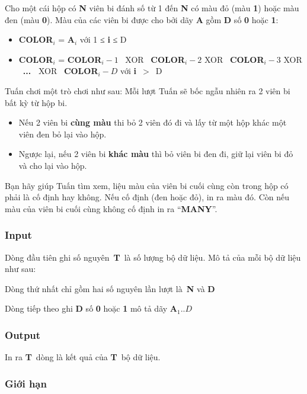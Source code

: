 

Cho một cái hộp có \textbf{N} viên bi đánh số từ 1 đến \textbf{N} có màu đỏ (màu \textbf{1}) hoặc màu đen (màu \textbf{0}). Màu của các viên bi được cho bởi dãy \textbf{A} gồm \textbf{D} số \textbf{0} hoặc \textbf{1}:
\begin{itemize}
	\item \textbf{\textbf{COLOR$_i$}} = \textbf{A$_i$} với 1 ≤ \textbf{i} ≤ D
	\item \textbf{COLOR$_i$} = \textbf{COLOR$_i - 1$}  XOR  \textbf{COLOR$_i - 2 $} XOR  \textbf{COLOR$_i - 3 $} XOR  \textbf{... } XOR  \textbf{COLOR$_i - D$} với \textbf{i} $>$ D
\end{itemize}

Tuấn chơi một trò chơi như sau: Mỗi lượt Tuấn sẽ bốc ngẫu nhiên ra 2 viên bi bất kỳ từ hộp bi.
\begin{itemize}
	\item Nếu 2 viên bi \textbf{cùng màu} thi bỏ 2 viên đó đi và lấy từ một hộp khác một viên đen bỏ lại vào hộp.
	\item Ngược lại, nếu 2 viên bi \textbf{khác màu} thì bỏ viên bi đen đi, giữ lại viên bi đỏ và cho lại vào hộp.
\end{itemize}

Bạn hãy giúp Tuấn tìm xem, liệu màu của viên bi cuối cùng còn trong hộp có phải là cố định hay không. Nếu cố định (đen hoặc đỏ), in ra màu đó. Còn nếu màu của viên bi cuối cùng không cố định in ra “\textbf{MANY}”.

\subsubsection{Input}

Dòng đầu tiên ghi số nguyên \textbf{T} là số lượng bộ dữ liệu. Mô tả của mỗi bộ dữ liệu như sau: 

Dòng thứ nhất chỉ gồm hai số nguyên lần lượt là \textbf{N} và \textbf{D}

Dòng tiếp theo ghi \textbf{D} số \textbf{0} hoặc \textbf{1} mô tả dãy \textbf{A$_1..D$}

\subsubsection{Output}

In ra \textbf{T} dòng là kết quả của \textbf{T} bộ dữ liệu.

\subsubsection{Giới hạn}


